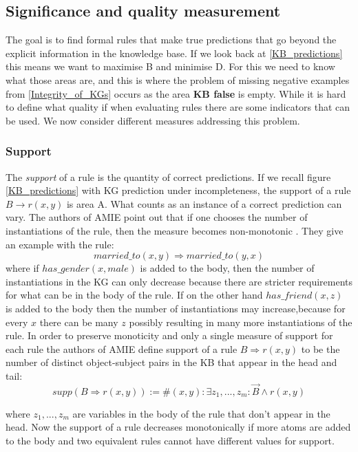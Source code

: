 \subsection{Significance and quality measurement}
\label{significance_and_quality}
The goal is to find formal rules that make true predictions that go beyond the explicit information in the knowledge base. If we look back at \cref{KB_predictions} this means we want to maximise B and minimise D. For this we need to know what those areas are, and this is where the problem of missing negative examples from \cref{Integrity_of_KGs} occurs as the area \textbf{KB false} is empty. While it is hard to define what quality if when evaluating rules there are some indicators that can be used. We now consider different measures addressing this problem.

\subsubsection{Support}
The \textit{support} of a rule is the quantity of correct predictions. If we recall figure \cref{KB_predictions} with KG prediction under incompleteness, the support of a rule $B \rightarrow r(x,y)$ is area A. What counts as an instance of a correct prediction can vary. The authors of AMIE point out that if one chooses the number of instantiations of the rule, then the measure becomes non-monotonic \cite{amie3}. They give an example with the rule:
\[married\_to(x, y) \Rightarrow married\_to(y, x)\]
where if $has\_gender(x, male)$ is added to the body, then the number of instantiations in the KG can only decrease because there are stricter requirements for what can be in the body of the rule. If on the other hand $has\_friend(x, z)$ is added to the body then the number of instantiations may increase,because for every $x$ there can be many $z$ possibly resulting in many more instantiations of the rule. In order to preserve monoticity and only a single measure of support for each rule the authors of AMIE define support of a rule $B\Rightarrow r(x, y)$ to be the number of distinct object-subject pairs in the KB that appear in the head and tail:
\[supp(B\Rightarrow r(x, y)) :=  \# (x, y) : \exists z_1 , ...,z_m : \vec{B} \wedge r(x, y)\]

where $z_1, ..., z_m$ are variables in the body of the rule that don't appear in the head. Now the support of a rule decreases monotonically if more atoms are added to the body and two equivalent rules cannot have different values for support.

